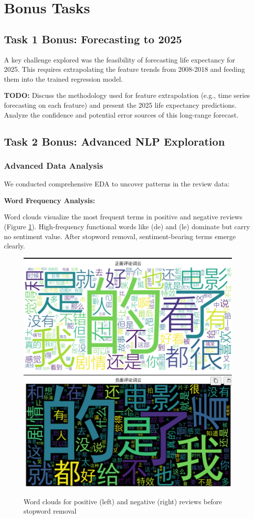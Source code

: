 \documentclass{article}
\begin{document}
\section{Bonus Tasks}
\label{sec:bonus}

\subsection{Task 1 Bonus: Forecasting to 2025}
A key challenge explored was the feasibility of forecasting life expectancy for 2025. This requires extrapolating the feature trends from 2008-2018 and feeding them into the trained regression model.

\textbf{TODO:} Discuss the methodology used for feature extrapolation (e.g., time series forecasting on each feature) and present the 2025 life expectancy predictions. Analyze the confidence and potential error sources of this long-range forecast.

\subsection{Task 2 Bonus: Advanced NLP Exploration}

\subsubsection{Advanced Data Analysis}
\label{sssec:advanced_analysis}

We conducted comprehensive EDA to uncover patterns in the review data:

\textbf{Word Frequency Analysis:} 

Word clouds visualize the most frequent terms in positive and negative reviews 
(Figure \ref{fig:wordclouds}). High-frequency functional words like (de) and (le) dominate 
but carry no sentiment value. After stopword removal, sentiment-bearing terms emerge clearly.

\begin{figure}[h]
    \centering
    \includegraphics[width=0.45\columnwidth]{pic/T2P2B1.1.png}
    \includegraphics[width=0.45\columnwidth]{pic/T2P2B1.2.png}
    \caption{Word clouds for positive (left) and negative (right) reviews before stopword removal}
    \label{fig:wordclouds}
\end{figure}
\end{document}
